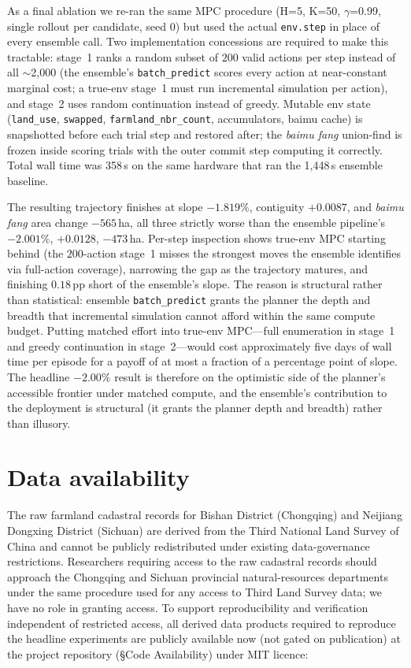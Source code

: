 \documentclass[11pt]{article}
\begin{document}
As a final ablation we re-ran the same MPC procedure (H=5, K=50, $\gamma$=0.99, single rollout per candidate, seed 0) but used the actual \texttt{env.step} in place of every ensemble call. Two implementation concessions are required to make this tractable: stage~1 ranks a random subset of $200$ valid actions per step instead of all $\sim$2{,}000 (the ensemble's \texttt{batch\_predict} scores every action at near-constant marginal cost; a true-env stage~1 must run incremental simulation per action), and stage~2 uses random continuation instead of greedy. Mutable env state (\texttt{land\_use}, \texttt{swapped}, \texttt{farmland\_nbr\_count}, accumulators, baimu cache) is snapshotted before each trial step and restored after; the \textit{baimu fang} union-find is frozen inside scoring trials with the outer commit step computing it correctly. Total wall time was 358\,s on the same hardware that ran the 1{,}448\,s ensemble baseline.

The resulting trajectory finishes at slope $-1.819\%$, contiguity $+0.0087$, and \textit{baimu fang} area change $-565$\,ha, all three strictly worse than the ensemble pipeline's $-2.001\%$, $+0.0128$, $-473$\,ha. Per-step inspection shows true-env MPC starting behind (the $200$-action stage~1 misses the strongest moves the ensemble identifies via full-action coverage), narrowing the gap as the trajectory matures, and finishing $0.18$\,pp short of the ensemble's slope. The reason is structural rather than statistical: ensemble \texttt{batch\_predict} grants the planner the depth and breadth that incremental simulation cannot afford within the same compute budget. Putting matched effort into true-env MPC---full enumeration in stage~1 and greedy continuation in stage~2---would cost approximately five days of wall time per episode for a payoff of at most a fraction of a percentage point of slope. The headline $-2.00\%$ result is therefore on the optimistic side of the planner's accessible frontier under matched compute, and the ensemble's contribution to the deployment is structural (it grants the planner depth and breadth) rather than illusory.

\section*{Data availability}
The raw farmland cadastral records for Bishan District (Chongqing) and Neijiang Dongxing District (Sichuan) are derived from the Third National Land Survey of China and cannot be publicly redistributed under existing data-governance restrictions. Researchers requiring access to the raw cadastral records should approach the Chongqing and Sichuan provincial natural-resources departments under the same procedure used for any access to Third Land Survey data; we have no role in granting access. To support reproducibility and verification independent of restricted access, all derived data products required to reproduce the headline experiments are publicly available now (not gated on publication) at the project repository (\S Code Availability) under MIT licence:
\end{document}

